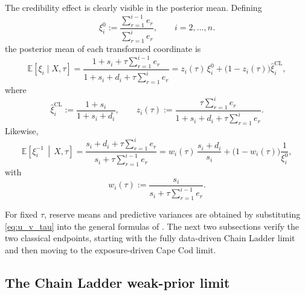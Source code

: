 \documentclass[11pt]{article}
\newcommand{\E}{\mathbb{E}}
\newcommand{\1}{\mathbf{1}}
\begin{document}
The credibility effect is clearly visible in the posterior mean. Defining
\begin{equation}
\xi_i^0:=
\frac{\sum_{r=1}^{i-1}e_r}{\sum_{r=1}^{i}e_r},
\qquad i=2,\dots,n.
\label{eq:xi0_def}
\end{equation}
the posterior mean of each transformed coordinate is
\begin{equation}
\E[\xi_i\mid X,\tau]
=
\frac{1+s_i+\tau\sum_{r=1}^{i-1}e_r}{1+s_i+d_i+\tau\sum_{r=1}^{i}e_r}
=
z_i(\tau)\,\xi_i^0+\bigl(1-z_i(\tau)\bigr)\widehat\xi_i^{\mathrm{CL}},
\label{eq:credibility_xi_mean}
\end{equation}
where
\begin{equation}
\widehat\xi_i^{\mathrm{CL}}:=\frac{1+s_i}{1+s_i+d_i},
\qquad
z_i(\tau):=\frac{\tau\sum_{r=1}^{i}e_r}{1+s_i+d_i+\tau\sum_{r=1}^{i}e_r}.
\label{eq:zi_tau}
\end{equation}
Likewise,
\begin{equation}
\E\!\left[\xi_i^{-1}\,\middle|\,X,\tau\right]
=
\frac{s_i+d_i+\tau\sum_{r=1}^{i}e_r}{s_i+\tau\sum_{r=1}^{i-1}e_r}
=
w_i(\tau)\,\frac{s_i+d_i}{s_i}+\bigl(1-w_i(\tau)\bigr)\frac{1}{\xi_i^0},
\label{eq:credibility_inverse2}
\end{equation}
with
\begin{equation}
w_i(\tau):=\frac{s_i}{s_i+\tau\sum_{r=1}^{i-1}e_r}.
\label{eq:wi_tau}
\end{equation}

For fixed $\tau$, reserve means and predictive variances are obtained by substituting \eqref{eq:u_v_tau} into the general formulas of . The next two subsections verify the two classical endpoints, starting with the fully data-driven Chain Ladder limit and then moving to the exposure-driven Cape Cod limit.

\subsection{The Chain Ladder weak-prior limit}\label{subsec:weak_prior_limit}
\end{document}
